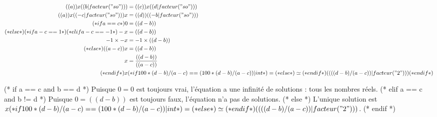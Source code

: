 \exercice*

\begin{align*}
  (( a )) x (( b|facteur("so") )) &= (( c )) x (( d|facteur("so") )) \\
  (( a )) x (( -c|facteur("so") ))x &= (( d )) (( -b|facteur("so") )) \\
  (* if a == c *)
    0 &= (( d - b )) \\
  (* else *)
    (* if a - c == 1 *)
    (* elif a - c == -1 *)
      -x &= (( d - b )) \\
      -1 \times -x &= -1 \times (( d - b )) \\
    (* else *)
      (( a - c )) x &= (( d - b )) \\
      x &= \frac{(( d - b ))}{(( a - c ))} \\
    (* endif *)
    x &
         (* if 100*(d-b)/(a-c) == (100*(d-b)/(a-c))|int *)
             =
         (* else *)
             \simeq
         (* endif *)
         (( ((d-b)/(a-c)) | facteur("2") ))
  (* endif *)
\end{align*}

(* if a == c and b == d *)
  Puisque $0=0$ est toujours vrai, l'équation a une infinité de solutions : tous les nombres réels.
(* elif a == c and b != d *)
  Puisque $0=((d - b))$ est toujours faux, l'équation n'a pas de solutions.
(* else *)
  L'unique solution est
  $x
  (* if 100*(d-b)/(a-c) == (100*(d-b)/(a-c))|int *)
      =
  (* else *)
      \simeq
  (* endif *)
  (( ((d-b)/(a-c)) | facteur("2") ))$.
(* endif *)
